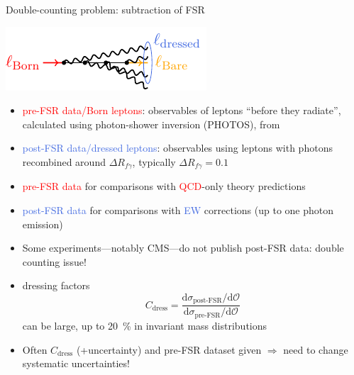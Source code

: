 \begin{frame}{Double-counting problem: subtraction of FSR}
\fontsize{9}{11}\selectfont
\begin{center}
\includegraphics[height=0.2\textheight]{ew_corrections/figures/fd05_photon_radiation}
\end{center}
\begin{itemize}
\item \textcolor{red}{pre-FSR data/Born leptons}: observables of leptons \enquote{before they radiate}, calculated using photon-shower inversion (\textrm{\textsc{PHOTOS}}), from
\item \textcolor{RoyalBlue}{post-FSR data/dressed leptons}: observables using leptons with photons recombined around $\Delta R_{f \gamma}$, typically $\Delta R_{f \gamma} = 0.1$
\end{itemize}
\begin{itemize}
\item \textcolor{red}{pre-FSR data} for comparisons with \textcolor{red}{QCD}-only theory predictions
\item \textcolor{RoyalBlue}{post-FSR data} for comparisons with \textcolor{RoyalBlue}{EW} corrections (up to one photon emission)
\end{itemize}

\vspace*{\fill}

\begin{itemize}
\item Some experiments---notably CMS---do not publish post-FSR data: double counting issue!
\item dressing factors
\begin{equation*}
C_\text{dress} = \frac{\mathrm{d} \sigma_\text{post-FSR} / \mathrm{d} \mathcal{O}}{\mathrm{d} \sigma_\text{pre-FSR} / \mathrm{d} \mathcal{O}}
\end{equation*}
can be large, \alert{up to \SI{20}{\percent}} in invariant mass distributions
\item Often $C_\text{dress}$ (+uncertainty) and pre-FSR dataset given $\Rightarrow$ need to change systematic uncertainties!
\end{itemize}
\end{frame}

